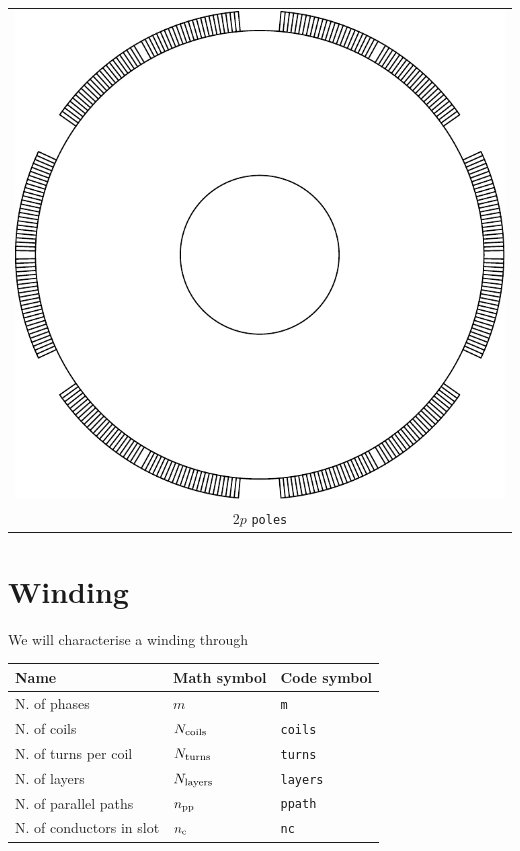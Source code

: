 \documentclass[a4paper,11pt,oneside,fleqn,titlepage]{report}
\newcommand{\Ncoils}{N_{\textup{coils}}}
\newcommand{\Nturns}{N_{\textup{turns}}}
\newcommand{\Nlayers}{N_{\textup{layers}}}
\newcommand{\npp}{n_{\textup{pp}}}
\newcommand{\nc}{n_{\textup{c}}}
\begin{document}
\begin{tabular}{c}
\includegraphics[scale=0.75]{../examples/rotors/2ppole} 
\\
$ 2p $ \texttt{poles}
\end{tabular}






\chapter{Winding}
We will characterise a winding through

\begin{table}[h]
\centering
\begin{tabular}{lll}
\toprule
Name         & Math symbol    & Code symbol 
\\\midrule
%
N. of phases & $ m $          & \texttt{m} 
\\
N. of coils  & $ \Ncoils $ & 
\texttt{coils} \\
N. of turns per coil & $ \Nturns $ & 
\texttt{turns} \\
N. of layers & $ \Nlayers $ & \texttt{layers} \\
N. of parallel paths & $ \npp $ & \texttt{ppath} \\
N. of conductors in slot & $ \nc $ & \texttt{nc} \\
\bottomrule
\end{tabular}
\end{table}
\end{document}
